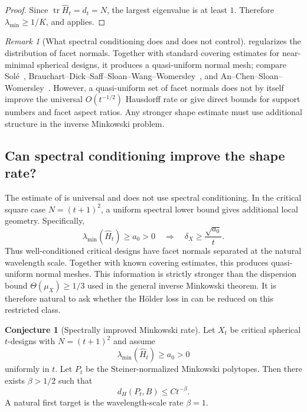 \documentclass[11pt]{article}
\theoremstyle{definition}
\newtheorem{conjecture}[theorem]{Conjecture}
\theoremstyle{remark}
\newtheorem{remark}[theorem]{Remark}
\newcommand{\tr}{\operatorname{tr}}
\begin{document}
\begin{proof}
Since $\tr\widehat H_t=d_t=N$, the largest eigenvalue is at least $1$. Therefore $\lambda_{\min}\ge1/K$, and  applies.
\end{proof}

\begin{remark}[What spectral conditioning does and does not control]\label{rem:spectral-limits}
 regularizes the distribution of facet normals. Together with standard covering estimates for near-minimal spherical designs, it produces a quasi-uniform normal mesh; compare Sol\'e~\cite{Sole1991}, Brauchart--Dick--Saff--Sloan--Wang--Womersley~\cite{Brauchart2015}, and An--Chen--Sloan--Womersley~\cite{An2010}. However, a quasi-uniform set of facet normals does not by itself improve the universal $O(t^{-1/2})$ Hausdorff rate or give direct bounds for support numbers and facet aspect ratios. Any stronger shape estimate must use additional structure in the inverse Minkowski problem.
\end{remark}

\subsection{Can spectral conditioning improve the shape rate?}
The estimate of  is universal and does not use spectral conditioning. In the critical square case $N=(t+1)^2$, a uniform spectral lower bound gives additional local geometry. Specifically,
\[
\lambda_{\min}(\widehat H_t)\ge a_0>0
\quad\Longrightarrow\quad
\delta_X\ge\frac{\sqrt{a_0}}{t}.
\]
Thus well-conditioned critical designs have facet normals separated at the natural wavelength scale. Together with known covering estimates, this produces quasi-uniform normal meshes. This information is strictly stronger than the dispersion bound $\Theta(\mu_X)\ge1/3$ used in the general inverse Minkowski theorem. It is therefore natural to ask whether the H\"older loss in  can be reduced on this restricted class.

\begin{conjecture}[Spectrally improved Minkowski rate]\label{conj:spectral-rate}
Let $X_t$ be critical spherical $t$-designs with $N=(t+1)^2$ and assume
\[
\lambda_{\min}(\widehat H_t)\ge a_0>0
\]
uniformly in $t$. Let $P_t$ be the Steiner-normalized Minkowski polytopes. Then there exists $\beta>1/2$ such that
\begin{equation}\label{eq:spectral-conj}
d_H(P_t,B)\le Ct^{-\beta}.
\end{equation}
A natural first target is the wavelength-scale rate $\beta=1$.
\end{conjecture}
\end{document}
